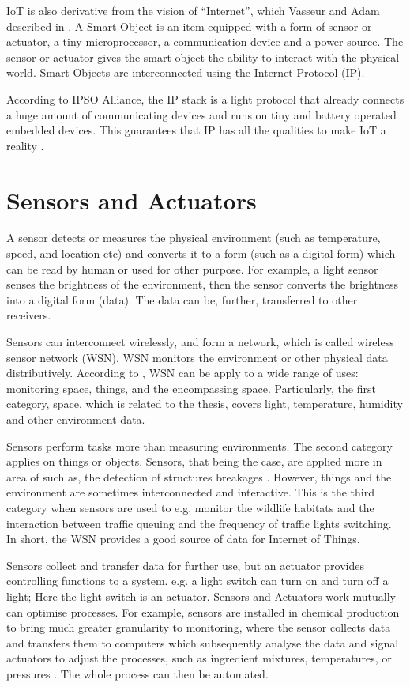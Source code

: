 IoT is also derivative from the vision of ``Internet'', which Vasseur and Adam described in \cite{vasseur2010interconnecting}. A Smart Object is an item equipped with a form of sensor or actuator, a tiny microprocessor, a communication device and a power source. The sensor or actuator gives the smart object the ability to interact with the physical world. Smart Objects are interconnected using the Internet Protocol (IP). 

According to IPSO Alliance, the IP stack is a light protocol that already connects a huge amount of communicating devices and runs on tiny and battery operated embedded devices. This guarantees that IP has all the qualities to make IoT a reality \cite{atzori2010internet}.

\section{Sensors and Actuators}
A sensor detects or measures the physical environment (such as temperature, speed, and location etc) and converts it to a form (such as a digital form) which can be read by human or used for other purpose. For example, a light sensor senses the brightness of the environment, then the sensor converts the brightness into a digital form (data). The data can be, further, transferred to other receivers.

Sensors can interconnect wirelessly, and form a network, which is called wireless sensor network (WSN). WSN monitors the environment or other physical data distributively. According to \cite{culler2004guest}, WSN can be apply to a wide range of uses: monitoring space, things, and the encompassing space. Particularly, the first category, space, which is related to the thesis, covers light, temperature, humidity and other environment data. 

Sensors perform tasks more than measuring environments. The second category applies on things or objects. Sensors, that being the case, are applied more in area of such as, the detection of structures breakages \cite{christin2009wireless}. However, things and the environment are sometimes interconnected and interactive. This is the third category when sensors are used to e.g. monitor the wildlife habitats \cite{culler2004guest} and the interaction between traffic queuing and the frequency of traffic lights switching. In short, the WSN provides a good source of data for Internet of Things.

Sensors collect and transfer data for further use, but an actuator provides controlling functions to a system. e.g. a light switch can turn on and turn off a light; Here the light switch is an actuator. Sensors and Actuators work mutually can optimise processes. For example, sensors are installed in chemical production to bring much greater granularity to monitoring, where the sensor collects data and transfers them to computers which subsequently analyse the data and signal actuators to adjust the processes, such as ingredient mixtures, temperatures, or pressures \cite{chui2010internet}. The whole process can then be automated. 

